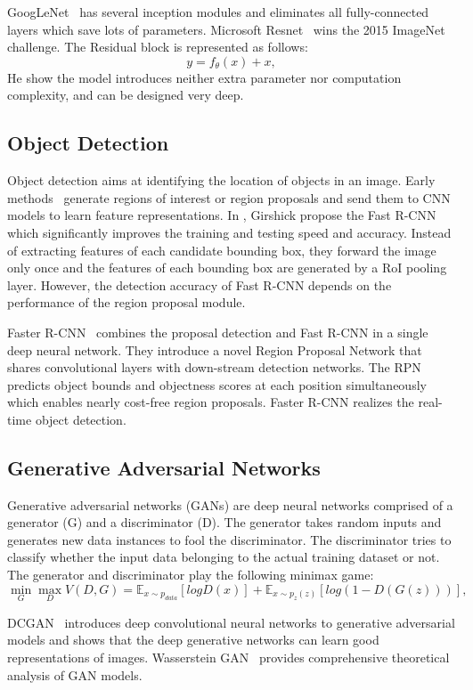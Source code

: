 GoogLeNet~\cite{szegedy2015going} has several inception modules and eliminates all fully-connected layers which save lots of parameters. Microsoft Resnet~\cite{he2016deep} wins the 2015 ImageNet challenge. The Residual block is represented as follows:
\begin{equation}
  y = f_\theta(x) + x,
\end{equation}
He \etal show the model introduces neither extra parameter nor computation complexity, and can be designed very deep.

\subsection{Object Detection}
Object detection aims at identifying the location of objects in an image. Early methods~\cite{girshick2014rich} generate regions of interest or region proposals and send them to CNN models to learn feature representations. In \cite{girshick2014rich}, Girshick \etal propose the Fast R-CNN which significantly improves the training and testing speed and accuracy. Instead of extracting features of each candidate bounding box, they forward the image only once and the features of each bounding box are generated by a RoI pooling layer. However, the detection accuracy of Fast R-CNN depends on the performance of the region proposal module. 

Faster R-CNN~\cite{ren2015faster} combines the proposal detection and Fast R-CNN in a single deep neural network. They introduce a novel Region Proposal Network that shares convolutional layers with down-stream detection networks. The RPN predicts object bounds and objectness scores at each position simultaneously which enables nearly cost-free region proposals. Faster R-CNN realizes the real-time object detection.

\subsection{Generative Adversarial Networks}
Generative adversarial networks (GANs) are deep neural networks comprised of a generator (G) and a discriminator (D). The generator takes random inputs and generates new data instances to fool the discriminator. The discriminator tries to classify whether the input data belonging to the actual training dataset or not. The generator and discriminator play the following minimax game:
\begin{equation}
  \min\limits_{G} \max\limits_{D} V(D, G) = \mathbb{E}_{x\sim p_{data}}[log D(x)] + \mathbb{E}_{x\sim p_{z}(z)}[log(1-D(G(z)))],
\end{equation}

DCGAN~\cite{radford2015unsupervised} introduces deep convolutional neural networks to generative adversarial models and shows that the deep generative networks can learn good representations of images. Wasserstein GAN~\cite{arjovsky2017wasserstein} provides comprehensive theoretical analysis of GAN models.